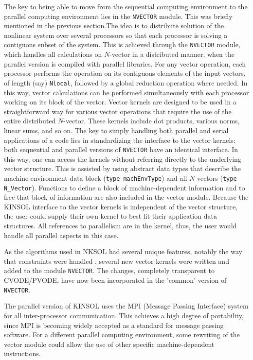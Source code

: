 \documentclass[11pt]{article}
\begin{document}
The key to being able to move from the sequential computing
environment to the parallel computing environment lies in the {\tt NVECTOR}
module. This was briefly mentioned in the previous section.The idea is to 
distribute solution of the nonlinear system over several processors so that 
each processor is solving a contiguous subset of the system. This is achieved 
through the {\tt NVECTOR} module, which handles all calculations on $N$-vector
in a distributed manner, when the parallel version is compiled with parallel 
libraries. For any vector operation, each processor performs the operation on 
its contiguous 
elements of the input vectors, of length (say) {\tt Nlocal}, followed 
by a global reduction operation where needed.  In this way, vector 
calculations can be performed simultaneously with each processor 
working on its block of the vector. Vector kernels are designed to be 
used in a straightforward way for various vector operations that 
require the use of the entire distributed $N$-vector.  These kernels 
include dot products, various norms, linear sums, and so on. The key 
to simply handling both parallel and serial applications of a code 
lies in standardizing the interface to the vector kernels: both sequential and
parallel versions of {\tt NVECTOR} have an identical interface. In this way, 
one can access the kernels without referring directly to the underlying 
vector structure. This is assisted by using abstract data types that 
describe the machine environment data block ({\tt type machEnvType}) 
and all $N$-vectors ({\tt type N\_Vector}). Functions
to define a block of machine-dependent information and to free that block of 
information are also included in the vector module. Because the KINSOL
interface to the vector kernels is independent of the vector structure, the
user could supply their own kernel to best fit their application data 
structures. All references to parallelism are in the kernel, thus, the user
would handle all parallel aspects in this case.

As the algorithms used in NKSOL had several unique features, notably the way 
that constraints were handled \cite{BrSa90}, several new vector 
kernels were written and added to the module {\tt NVECTOR}. The changes, 
completely transparent to CVODE/PVODE, have now been incorporated in the
'common' version of {\tt NVECTOR}.

The parallel version of KINSOL uses the MPI (Message Passing
Interface) system \cite{MPI} for all inter-processor
communication. This achieves a high degree of portability, since MPI
is becoming widely accepted as a standard for message passing
software. For a different parallel computing environment, some rewriting of the
vector module could allow the use of other specific machine-dependent
instructions.
\end{document}
